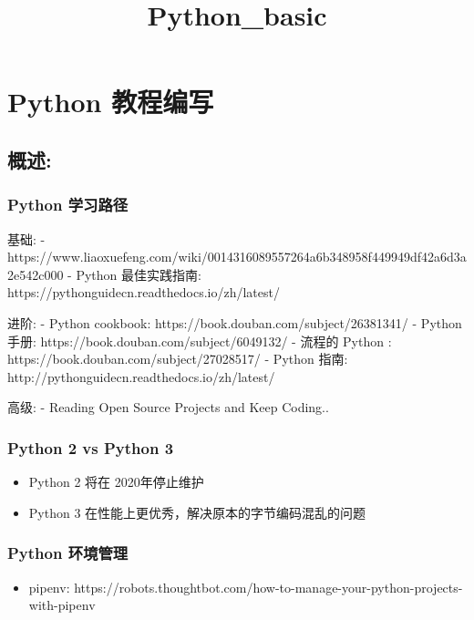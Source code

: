 \documentclass[11pt]{article}
\title{Python\_basic}
\providecommand{\tightlist}{%
      \setlength{\itemsep}{0pt}\setlength{\parskip}{0pt}}
\begin{document}
    
    
    \maketitle
    
    

    
    \section{Python 教程编写}\label{python-ux6559ux7a0bux7f16ux5199}

    \subsection{概述:}\label{ux6982ux8ff0}

\subsubsection{Python 学习路径}\label{python-ux5b66ux4e60ux8defux5f84}

基础: -
https://www.liaoxuefeng.com/wiki/0014316089557264a6b348958f449949df42a6d3a2e542c000
- Python 最佳实践指南: https://pythonguidecn.readthedocs.io/zh/latest/

进阶: - Python cookbook: https://book.douban.com/subject/26381341/ -
Python 手册: https://book.douban.com/subject/6049132/ - 流程的 Python :
https://book.douban.com/subject/27028517/ - Python 指南:
http://pythonguidecn.readthedocs.io/zh/latest/

高级: - Reading Open Source Projects and Keep Coding..

\subsubsection{Python 2 vs Python 3}\label{python-2-vs-python-3}

\begin{itemize}
\tightlist
\item
  Python 2 将在 2020年停止维护
\item
  Python 3 在性能上更优秀，解决原本的字节编码混乱的问题
\end{itemize}

\subsubsection{Python 环境管理}\label{python-ux73afux5883ux7ba1ux7406}

\begin{itemize}
\tightlist
\item
  pipenv:
  https://robots.thoughtbot.com/how-to-manage-your-python-projects-with-pipenv
\end{itemize}
\end{document}
